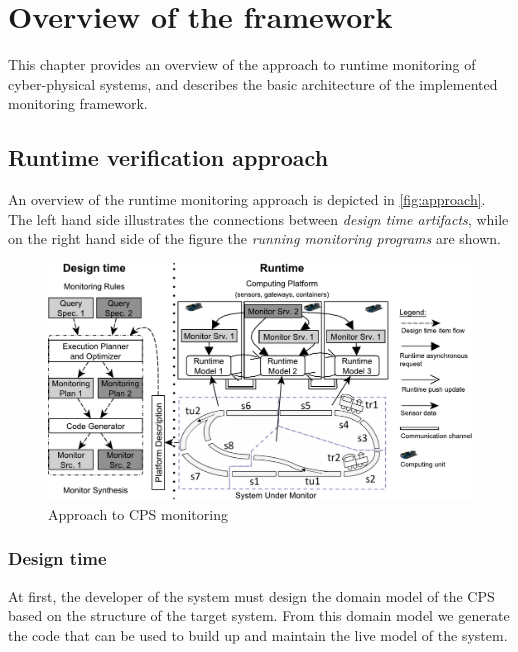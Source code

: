 \chapter{Overview of the framework}


This chapter provides an overview of the approach to runtime monitoring of cyber-physical systems, and describes the basic architecture of the implemented monitoring framework.

\section{Runtime verification approach}

An overview of the runtime monitoring approach is depicted in \autoref{fig:approach}. 
The left hand side illustrates the connections between \emph{design time artifacts}, while on the right hand side of the figure the \emph{running monitoring programs} are shown.

\begin{figure}[h]
	\begin{center}
		\includegraphics[width=\textwidth]{figures/fase-overview-crop.pdf}
		\caption{Approach to CPS monitoring}
		\label{fig:approach}
	\end{center}
\end{figure}

\subsection{Design time}

At first, the developer of the system must design the domain model of the CPS based on the structure of the target system.
From this domain model we generate the code that can be used to build up and maintain the live model of the system.

